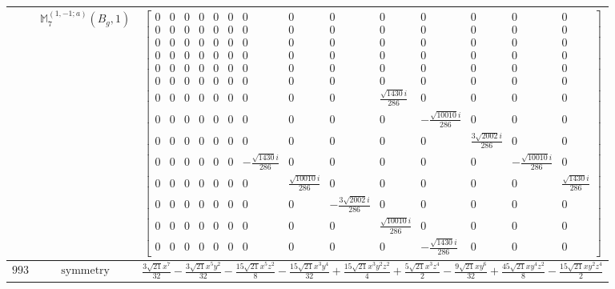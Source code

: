 \documentclass[fleqn,8pt,landscape]{jsarticle}
\begin{document}
\begin{longtable}{ccc}
$  $ & $ \mathbb{M}_{7}^{(1,-1;a)}(B_{g},1) $ & $ \begin{bmatrix} 0 & 0 & 0 & 0 & 0 & 0 & 0 & 0 & 0 & 0 & 0 & 0 & 0 & 0 \\ 0 & 0 & 0 & 0 & 0 & 0 & 0 & 0 & 0 & 0 & 0 & 0 & 0 & 0 \\ 0 & 0 & 0 & 0 & 0 & 0 & 0 & 0 & 0 & 0 & 0 & 0 & 0 & 0 \\ 0 & 0 & 0 & 0 & 0 & 0 & 0 & 0 & 0 & 0 & 0 & 0 & 0 & 0 \\ 0 & 0 & 0 & 0 & 0 & 0 & 0 & 0 & 0 & 0 & 0 & 0 & 0 & 0 \\ 0 & 0 & 0 & 0 & 0 & 0 & 0 & 0 & 0 & 0 & 0 & 0 & 0 & 0 \\ 0 & 0 & 0 & 0 & 0 & 0 & 0 & 0 & 0 & \frac{\sqrt{1430} i}{286} & 0 & 0 & 0 & 0 \\ 0 & 0 & 0 & 0 & 0 & 0 & 0 & 0 & 0 & 0 & - \frac{\sqrt{10010} i}{286} & 0 & 0 & 0 \\ 0 & 0 & 0 & 0 & 0 & 0 & 0 & 0 & 0 & 0 & 0 & \frac{3 \sqrt{2002} i}{286} & 0 & 0 \\ 0 & 0 & 0 & 0 & 0 & 0 & - \frac{\sqrt{1430} i}{286} & 0 & 0 & 0 & 0 & 0 & - \frac{\sqrt{10010} i}{286} & 0 \\ 0 & 0 & 0 & 0 & 0 & 0 & 0 & \frac{\sqrt{10010} i}{286} & 0 & 0 & 0 & 0 & 0 & \frac{\sqrt{1430} i}{286} \\ 0 & 0 & 0 & 0 & 0 & 0 & 0 & 0 & - \frac{3 \sqrt{2002} i}{286} & 0 & 0 & 0 & 0 & 0 \\ 0 & 0 & 0 & 0 & 0 & 0 & 0 & 0 & 0 & \frac{\sqrt{10010} i}{286} & 0 & 0 & 0 & 0 \\ 0 & 0 & 0 & 0 & 0 & 0 & 0 & 0 & 0 & 0 & - \frac{\sqrt{1430} i}{286} & 0 & 0 & 0 \end{bmatrix} $ \\ \hline
$ 993 $ & $ \text{symmetry} $ & $ \frac{3 \sqrt{21} x^{7}}{32} - \frac{3 \sqrt{21} x^{5} y^{2}}{32} - \frac{15 \sqrt{21} x^{5} z^{2}}{8} - \frac{15 \sqrt{21} x^{3} y^{4}}{32} + \frac{15 \sqrt{21} x^{3} y^{2} z^{2}}{4} + \frac{5 \sqrt{21} x^{3} z^{4}}{2} - \frac{9 \sqrt{21} x y^{6}}{32} + \frac{45 \sqrt{21} x y^{4} z^{2}}{8} - \frac{15 \sqrt{21} x y^{2} z^{4}}{2} $ \\

\end{longtable}
\end{document}
